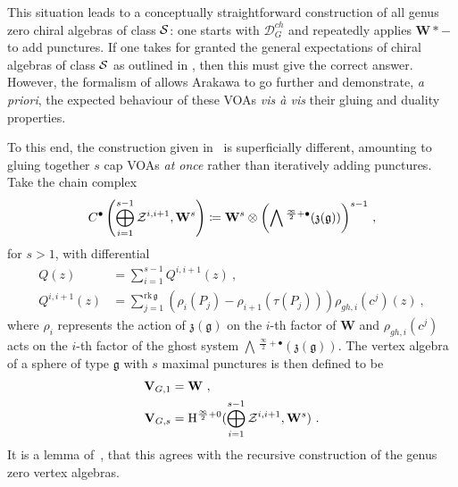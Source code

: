 \documentclass[a4paper]{article}
\def\SS{{\cal S}}
\def\ZZ{{\cal Z}}
\def\gf{\mathfrak{g}}
\newcommand{\Hi}[1]{\mathrm{H}^{\frac{\infty}{2}+#1}}
\newcommand{\Li}[1]{\mathrm{\bigwedge}\,^{\frac{\infty}{2}+#1}}
\def\D{\mathcal{D}^{ch}}
\def\W{\mathbf{W}}
\def\V{\mathbf{V}}
\begin{document}
This situation leads to a conceptually straightforward construction of all genus zero chiral algebras of class $\SS$: one starts with $\D_G$ and repeatedly applies $\W\ast-$ to add punctures. If one takes for granted the general expectations of chiral algebras of class $\SS$ as outlined in \cite{Beem:2014rza}, then this must give the correct answer. However, the formalism of \cite{Arakawa:2018egx} allows Arakawa to go further and demonstrate, \emph{a priori}, the expected behaviour of these VOAs \emph{vis \`a vis} their gluing and duality properties.

To this end, the construction given in~\cite{Arakawa:2018egx} is superficially different, amounting to gluing together $s$ cap VOAs \emph{at once} rather than iteratively adding punctures. Take the chain complex
\begin{equation}
\label{eq:ara_chain_cons}
	C^\bullet\left(\bigoplus_{i=1}^{s-1}\ZZ^{i,i+1},\W^{s}\right)\coloneqq \W^{s}\otimes\bigg( \Li{\bullet}(\mathfrak{z}(\gf))\bigg)^{s-1}~,
\end{equation}
for $s>1$, with differential
\begin{equation}\label{eq:ffmulti}
	\begin{split}
		Q(z)  &= \sum_{i=1}^{s-1} Q^{i,i+1}(z)~,\\
		Q^{i,i+1}(z) &= \sum_{j=1}^{\mathrm{rk}\,\gf} (\rho_i(P_j)-\rho_{i+1}(\tau(P_j)))\rho_{gh,i}(c^j)(z)~,
	\end{split}
\end{equation}
where $\rho_i$ represents the action of $\mathfrak{z}(\gf)$ on the $i$-th factor of $\W$ and $\rho_{gh,i}(c^j)$ acts on the $i$-th factor of the ghost system $\Li{\bullet}(\mathfrak{z}(\gf))$. The vertex algebra of a sphere of type $\gf$ with $s$ maximal punctures is then defined to be
\begin{equation}\label{eq:voaspheres}
\begin{split}
    \V_{G,1} &= \W~,\\
    \V_{G,s} &= \Hi{0}(\bigoplus_{i=1}^{s-1}\ZZ^{i,i+1},\W^{s})~.
\end{split}
\end{equation}
It is a lemma of~\cite{Arakawa:2018egx}, that this agrees with the recursive construction of the genus zero vertex algebras.
\end{document}
